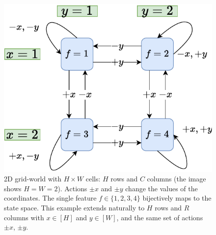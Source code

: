 \documentclass[a4paper,11pt,oneside]{report}
\begin{document}
\begin{figure}[t]
    \centering
    \includegraphics[width=0.7\linewidth]{diagrams/env_2d_2x2.pdf}
    \caption{2D grid-world with $H\times W$ cells: $H$ rows and $C$ columns (the image shows $H=W=2$). Actions $\pm x$ and $\pm y$ change the values of the coordinates. The single feature $f\in\{1,2,3,4\}$ bijectively maps to the state space. This example extends naturally to $H$ rows and $R$ columns with $x\in[H]$ and $y\in [W]$, and the same set of actions $\pm x$, $\pm y$.}
    \label{fig:env2d2x2}
\end{figure}
\end{document}
